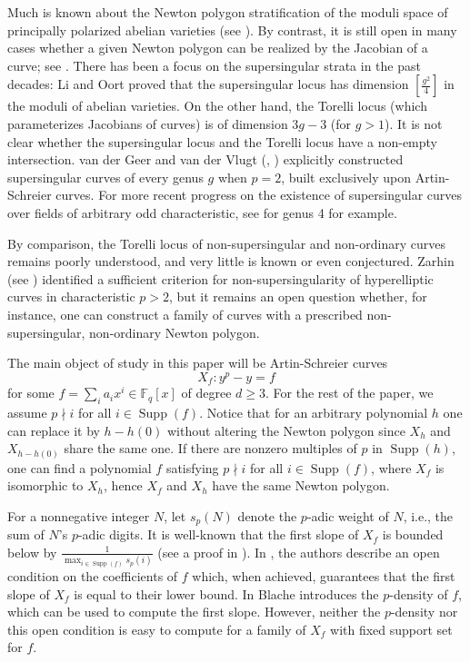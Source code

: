 \documentclass{amsart}
\numberwithin{equation}{section}
\newcommand{\F}{\mathbb{F}}
\DeclareMathOperator{\Supp}{Supp}
\theoremstyle{plain}
\theoremstyle{definition}
\begin{document}
Much is known about  the Newton polygon stratification of the moduli space of 
principally polarized abelian varieties (see \cite{Oo91b}). 
By contrast, it is still open in many cases 
whether a given Newton polygon can be realized by the Jacobian of a curve; 
see \cite{Oo91a}.
There has been a focus on the supersingular strata in the past decades:
Li and Oort \cite{LO98} proved that the supersingular locus has dimension 
$[\frac{g^2}{4}]$ in the moduli of abelian varieties. 
On the other hand, the Torelli locus (which parameterizes Jacobians of curves) 
is of dimension  $3g-3$ (for $g>1$).
It is not clear whether the supersingular locus and the Torelli locus 
have a non-empty intersection.
van der Geer and van der Vlugt (\cite{GV92}, \cite{GV95})
explicitly constructed supersingular curves of 
every genus $g$ when $p=2$, built exclusively upon
Artin-Schreier curves.  
For more recent progress on the existence of supersingular curves 
over fields of arbitrary odd characteristic, see \cite{KHS20} for genus 4 for example.

By comparison, the Torelli locus 
of non-supersingular and non-ordinary curves remains poorly understood, and 
very little is known or even conjectured.
Zarhin (see \cite{Zar04}) identified a sufficient criterion
for non-supersingularity of hyperelliptic curves in characteristic $p>2$,
but it remains an open question whether,
for instance,
one can construct a family of curves 
with a prescribed non-supersingular, non-ordinary Newton polygon.

The main object of study in this paper will be Artin-Schreier curves
\[
    X_f : y^p - y = f
\]
for some $f = \sum_{i} a_i x^i\in\F_q[x]$
of degree $d\ge 3$. 
For the rest of the paper, we assume $p\nmid i$ for all $i\in \Supp(f)$.
Notice that for an arbitrary polynomial $h$ one can 
replace it by $h-h(0)$ without altering the Newton polygon
since $X_h$ and $X_{h-h(0)}$ share the same one. 
If there are nonzero multiples of $p$ in $\Supp(h)$, 
one can find a polynomial $f$ satisfying $p\nmid i$ for all $i\in \Supp(f)$, 
where $X_f$ is isomorphic to $X_h$, hence $X_f$ and $X_h$ have the 
same Newton polygon.

For a nonnegative integer $N$, let $s_p(N)$ denote the
$p$-adic weight of $N$, i.e., the sum of $N$'s $p$-adic digits.
It is well-known that the first slope of
$X_f$ is bounded below by $\frac{1}{\max_{i \in \Supp(f)}s_p(i)}$
(see a proof in \cite[Theorem 4.1]{Wan95}). 
In \cite{MSCK04}, the authors describe an open condition on the coefficients
of $f$ which, when achieved, guarantees that the first slope
of $X_f$ is equal to their lower bound.
In \cite{Bl12} Blache introduces the $p$-density of $f$, 
which can be used to compute the first slope.    
However, neither the $p$-density nor this open condition is easy to compute
for a family of $X_f$ with fixed support set for $f$. 
\end{document}
